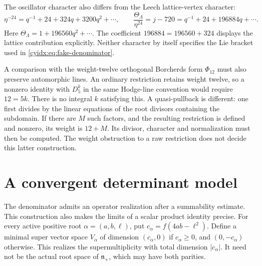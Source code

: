 The oscillator character also differs from the Leech
lattice-vertex character:
\[
 \eta^{-24}=q^{-1}+24+324q+3200q^2+\cdots,
 \qquad
 \frac{\Theta_\Lambda}{\eta^{24}}
       =j-720=q^{-1}+24+196884q+\cdots.
\]
Here \(\Theta_\Lambda=1+196560q^2+\cdots\).
The coefficient \(196884=196560+324\) displays the
lattice contribution explicitly. Neither character by
itself specifies the Lie bracket used in
\eqref{cyidx:eq:fake-denominator}.

A comparison with the weight-twelve orthogonal Borcherds
form \(\Phi_{12}\) must also preserve automorphic lines.
An ordinary restriction retains weight twelve, so a
nonzero identity with \(D_5^k\) in the same Hodge-line
convention would require \(12=5k\). There is no integral
\(k\) satisfying this. A quasi-pullback is different:
one first divides by the linear equations of the root
divisors containing the subdomain. If there are \(M\)
such factors, and the resulting restriction is defined
and nonzero, its weight is \(12+M\). Its divisor,
character and normalization must then be computed.
The weight obstruction to a raw restriction does not
decide this latter construction.

\section{A convergent determinant model}
\label{cyidx:sec:Fredholm}

The denominator admits an operator realization after a
summability estimate. This construction also makes the
limits of a scalar product identity precise.
For every active positive root \(\alpha=(a,b,\ell)\),
put \(c_\alpha=f(4ab-\ell^2)\). Define a minimal
super vector space \(V_\alpha\) of dimension
\((c_\alpha,0)\) if \(c_\alpha\geq0\), and
\((0,-c_\alpha)\) otherwise. This realizes the
supermultiplicity with total dimension \(|c_\alpha|\).
It need not be the actual root space of
\(\mathfrak n_+\), which may have both parities.

